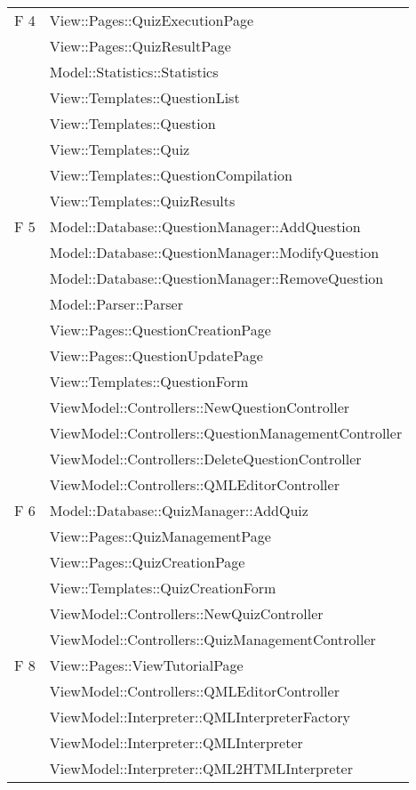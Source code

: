 \begin{longtable}{p{}p{}}
\midrule	
F 4		& View::Pages::QuizExecutionPage\\
		& View::Pages::QuizResultPage\\
		& Model::Statistics::Statistics\\
		& View::Templates::QuestionList\\
		& View::Templates::Question\\
		& View::Templates::Quiz\\
		& View::Templates::QuestionCompilation\\
		& View::Templates::QuizResults\\
\midrule
F 5		& Model::Database::QuestionManager::AddQuestion\\
		& Model::Database::QuestionManager::ModifyQuestion\\
		& Model::Database::QuestionManager::RemoveQuestion\\
		& Model::Parser::Parser\\
		& View::Pages::QuestionCreationPage\\
			& View::Pages::QuestionUpdatePage\\
			& View::Templates::QuestionForm\\	
			& ViewModel::Controllers::NewQuestionController\\
			& ViewModel::Controllers::QuestionManagementController\\
			& ViewModel::Controllers::DeleteQuestionController\\
			& ViewModel::Controllers::QMLEditorController\\
\midrule
F 6		& Model::Database::QuizManager::AddQuiz\\
& View::Pages::QuizManagementPage\\	
		& View::Pages::QuizCreationPage\\
		& View::Templates::QuizCreationForm\\
		& ViewModel::Controllers::NewQuizController\\
		& ViewModel::Controllers::QuizManagementController\\

\midrule
F 8 & View::Pages::ViewTutorialPage\\
	& ViewModel::Controllers::QMLEditorController\\
	& ViewModel::Interpreter::QMLInterpreterFactory\\
	& ViewModel::Interpreter::QMLInterpreter\\
	& ViewModel::Interpreter::QML2HTMLInterpreter\\
			
	\end{longtable}
